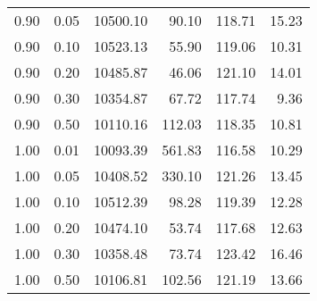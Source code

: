 \begin{table}
\begin{tabular}{rrrrrr}
0.90 & 0.05 & 10500.10 & 90.10 & 118.71 & 15.23 \\
0.90 & 0.10 & 10523.13 & 55.90 & 119.06 & 10.31 \\
0.90 & 0.20 & 10485.87 & 46.06 & 121.10 & 14.01 \\
0.90 & 0.30 & 10354.87 & 67.72 & 117.74 & 9.36 \\
0.90 & 0.50 & 10110.16 & 112.03 & 118.35 & 10.81 \\
1.00 & 0.01 & 10093.39 & 561.83 & 116.58 & 10.29 \\
1.00 & 0.05 & 10408.52 & 330.10 & 121.26 & 13.45 \\
1.00 & 0.10 & 10512.39 & 98.28 & 119.39 & 12.28 \\
1.00 & 0.20 & 10474.10 & 53.74 & 117.68 & 12.63 \\
1.00 & 0.30 & 10358.48 & 73.74 & 123.42 & 16.46 \\
1.00 & 0.50 & 10106.81 & 102.56 & 121.19 & 13.66 \\
\bottomrule
\end{tabular}
\end{table}
